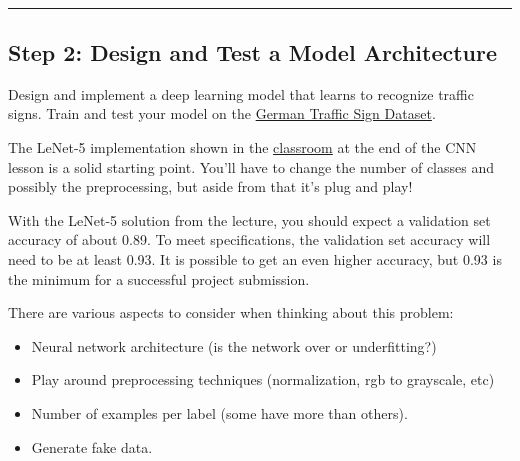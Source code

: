 \documentclass[11pt]{article}
\providecommand{\tightlist}{%
      \setlength{\itemsep}{0pt}\setlength{\parskip}{0pt}}
\begin{document}
    \begin{center}
    \end{center}
    { \hspace*{\fill} \\}
    
    \begin{center}\rule{0.5\linewidth}{\linethickness}\end{center}

\subsection{Step 2: Design and Test a Model
Architecture}\label{step-2-design-and-test-a-model-architecture}

Design and implement a deep learning model that learns to recognize
traffic signs. Train and test your model on the
\href{http://benchmark.ini.rub.de/?section=gtsrb\&subsection=dataset}{German
Traffic Sign Dataset}.

The LeNet-5 implementation shown in the
\href{https://classroom.udacity.com/nanodegrees/nd013/parts/fbf77062-5703-404e-b60c-95b78b2f3f9e/modules/6df7ae49-c61c-4bb2-a23e-6527e69209ec/lessons/601ae704-1035-4287-8b11-e2c2716217ad/concepts/d4aca031-508f-4e0b-b493-e7b706120f81}{classroom}
at the end of the CNN lesson is a solid starting point. You'll have to
change the number of classes and possibly the preprocessing, but aside
from that it's plug and play!

With the LeNet-5 solution from the lecture, you should expect a
validation set accuracy of about 0.89. To meet specifications, the
validation set accuracy will need to be at least 0.93. It is possible to
get an even higher accuracy, but 0.93 is the minimum for a successful
project submission.

There are various aspects to consider when thinking about this problem:

\begin{itemize}
\tightlist
\item
  Neural network architecture (is the network over or underfitting?)
\item
  Play around preprocessing techniques (normalization, rgb to grayscale,
  etc)
\item
  Number of examples per label (some have more than others).
\item
  Generate fake data.
\end{itemize}
\end{document}
